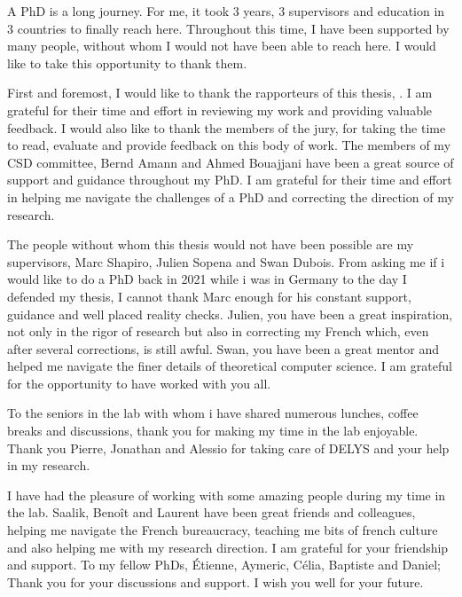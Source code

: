 %

A PhD is a long journey. For me, it took 3 years, 3 supervisors and education in 3 countries to finally reach here. Throughout this time, I have been supported by many people, without whom I would not have been able to reach here. I would like to take this opportunity to thank them. 

First and foremost, I would like to thank the rapporteurs of this thesis, . I am grateful for their time and effort in reviewing my work and providing valuable feedback. I would also like to thank the members of the jury,  for taking the time to read, evaluate and provide feedback on this body of work. The members of my CSD committee, Bernd Amann and Ahmed Bouajjani have been a great source of support and guidance throughout my PhD. I am grateful for their time and effort in helping me navigate the challenges of a PhD and correcting the direction of my research. 

The people without whom this thesis would not have been possible are my supervisors, Marc Shapiro, Julien Sopena and Swan Dubois. From asking me if i would like to do a PhD back in 2021 while i was in Germany to the day I defended my thesis, I cannot thank Marc enough for his constant support, guidance and well placed reality checks. Julien, you have been a great inspiration, not only in the rigor of research but also in correcting my French which, even after several corrections, is still awful. Swan, you have been a great mentor and helped me navigate the finer details of theoretical computer science. I am grateful for the opportunity to have worked with you all.

To the seniors in the lab with whom i have shared numerous lunches, coffee breaks and discussions, thank you for making my time in the lab enjoyable. Thank you Pierre, Jonathan and Alessio for taking care of DELYS and your help in my research. 

I have had the pleasure of working with some amazing people during my time in the lab. Saalik, Benoît and Laurent have been great friends and colleagues, helping me navigate the French bureaucracy, teaching me bits of french culture and also helping me with my research direction. I am grateful for your friendship and support. To my fellow PhDs, Étienne, Aymeric, Célia, Baptiste and Daniel; Thank you for your discussions and support. I wish you well for your future. 

